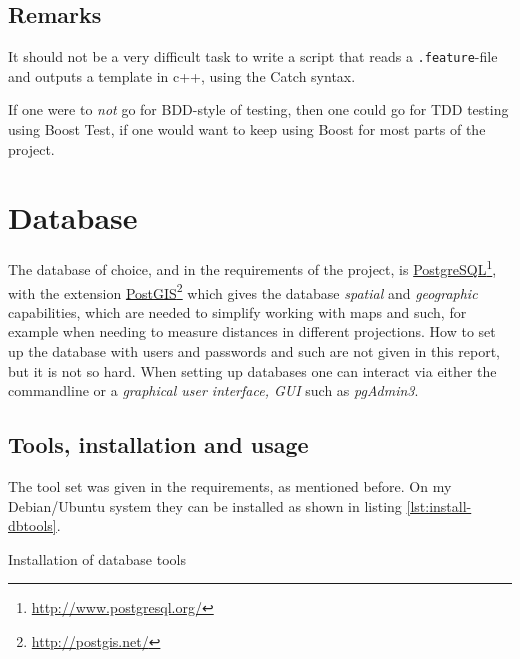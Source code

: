 \documentclass[../main.tex]{subfiles}
\begin{document}
\subsection{Remarks}
It should not be a very difficult task to write a script that reads a \texttt{.feature}-file and outputs a template in c++, using the Catch syntax.

If one were to \emph{not} go for BDD-style of testing, then one could go for TDD testing using Boost Test, if one would want to keep using Boost for most parts of the project.


\section{Database}
The database of choice, and in the requirements of the project, is  \href{http://www.postgresql.org/}{PostgreSQL}\footnote{\url{http://www.postgresql.org/}}, with the extension \href{http://postgis.net/}{PostGIS}\footnote{\url{http://postgis.net/}} which gives the database \emph{spatial} and \emph{geographic} capabilities, which are needed to simplify working with maps and such, for example when needing to measure distances in different projections. How to set up the database with users and passwords and such are not given in this report, but it is not so hard. When setting up databases one can interact via either the commandline or a \emph{graphical user interface, GUI} such as \emph{pgAdmin3}.

\subsection{Tools, installation and usage}
The tool set was given in the requirements, as mentioned before. On my Debian/Ubuntu system they can be installed as shown in listing \ref{lst:install-dbtools}.


\begin{mylisting}
\caption{Installation of database tools}
\label{lst:install-dbtools}
\end{mylisting}
\end{document}
